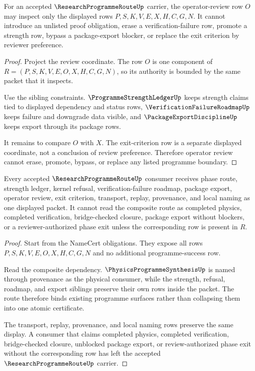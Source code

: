 \begin{theorem}
\label{thm:research-programme-route-review-boundary}
For an accepted $\ResearchProgrammeRouteUp$ carrier, the operator-review row $O$ may inspect only the displayed rows $P,S,K,V,E,X,H,C,G,N$. It cannot introduce an unlisted proof obligation, erase a verification-failure row, promote a strength row, bypass a package-export blocker, or replace the exit criterion by reviewer preference.
\end{theorem}
\begin{proof}
Project the review coordinate. The row $O$ is one component of $R=(P,S,K,V,E,O,X,H,C,G,N)$, so its authority is bounded by the same packet that it inspects.

Use the sibling constraints. $\ProgrammeStrengthLedgerUp$ keeps strength claims tied to displayed dependency and status rows, $\VerificationFailureRoadmapUp$ keeps failure and downgrade data visible, and $\PackageExportDisciplineUp$ keeps export through its package rows.

It remains to compare $O$ with $X$. The exit-criterion row is a separate displayed coordinate, not a conclusion of review preference. Therefore operator review cannot erase, promote, bypass, or replace any listed programme boundary.
\end{proof}

\begin{theorem}
\label{thm:research-programme-route-nonescape}
Every accepted $\ResearchProgrammeRouteUp$ consumer receives phase route, strength ledger, kernel refusal, verification-failure roadmap, package export, operator review, exit criterion, transport, replay, provenance, and local naming as one displayed packet. It cannot read the composite route as completed physics, completed verification, bridge-checked closure, package export without blockers, or a reviewer-authorized phase exit unless the corresponding row is present in $R$.
\end{theorem}
\begin{proof}
Start from the NameCert obligations. They expose all rows $P,S,K,V,E,O,X,H,C,G,N$ and no additional programme-success row.

Read the composite dependency. $\PhysicsProgrammeSynthesisUp$ is named through provenance as the physical consumer, while the strength, refusal, roadmap, and export siblings preserve their own rows inside the packet. The route therefore binds existing programme surfaces rather than collapsing them into one atomic certificate.

The transport, replay, provenance, and local naming rows preserve the same display. A consumer that claims completed physics, completed verification, bridge-checked closure, unblocked package export, or review-authorized phase exit without the corresponding row has left the accepted $\ResearchProgrammeRouteUp$ carrier.
\end{proof}

